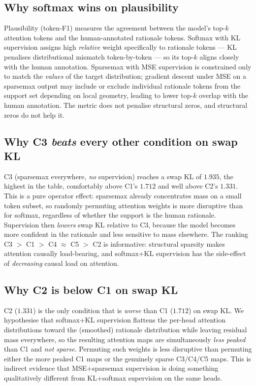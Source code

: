 \documentclass{article}
\begin{document}
\subsection{Why softmax wins on plausibility}

Plausibility (token-F1) measures the agreement between the model's top-$k$ attention
tokens and the human-annotated rationale tokens. Softmax with KL supervision assigns
high \emph{relative} weight specifically to rationale tokens --- KL penalises
distributional mismatch token-by-token --- so its top-$k$ aligns closely with the
human annotation. Sparsemax with MSE supervision is constrained only to match the
\emph{values} of the target distribution; gradient descent under MSE on a sparsemax
output may include or exclude individual rationale tokens from the support set
depending on local geometry, leading to lower top-$k$ overlap with the human
annotation. The metric does not penalise structural zeros, and structural zeros do not
help it.

\subsection{Why C3 \emph{beats} every other condition on swap KL}

C3 (sparsemax everywhere, \emph{no} supervision) reaches a swap KL of $1.935$, the
highest in the table, comfortably above C1's $1.712$ and well above C2's $1.331$. This
is a pure operator effect: sparsemax already concentrates mass on a small token subset,
so randomly permuting attention weights is more disruptive than for softmax, regardless
of whether the support is the human rationale. Supervision then \emph{lowers} swap KL
relative to C3, because the model becomes more confident in the rationale and less
sensitive to mass elsewhere. The ranking C3 $>$ C1 $>$ C4 $\approx$ C5 $>$ C2 is
informative: structural sparsity makes attention causally load-bearing, and softmax+KL
supervision has the side-effect of \emph{decreasing} causal load on attention.

\subsection{Why C2 is below C1 on swap KL}

C2 ($1.331$) is the only condition that is \emph{worse} than C1 ($1.712$) on swap KL.
We hypothesise that softmax+KL supervision flattens the per-head attention
distributions toward the (smoothed) rationale distribution while leaving residual mass
everywhere, so the resulting attention maps are simultaneously \emph{less peaked} than
C1 and \emph{not sparse}. Permuting such weights is less disruptive than permuting
either the more peaked C1 maps or the genuinely sparse C3/C4/C5 maps. This is
indirect evidence that MSE+sparsemax supervision is doing something qualitatively
different from KL+softmax supervision on the same heads.
\end{document}
